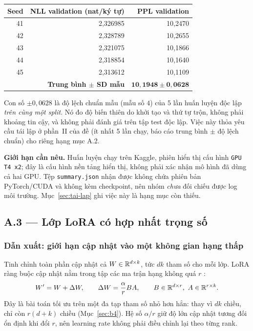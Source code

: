 \begin{center}
\begin{tabular}{rrr}
\toprule
\textbf{Seed} & \textbf{NLL validation (nat/ký tự)} & \textbf{PPL validation}\\
\midrule
41 & 2,326985 & 10,2470\\
42 & 2,328789 & 10,2655\\
43 & 2,321075 & 10,1866\\
44 & 2,318854 & 10,1640\\
45 & 2,313612 & 10,1109\\
\midrule
\multicolumn{2}{r}{\textbf{Trung bình $\pm$ SD mẫu}} & $\mathbf{10{,}1948 \pm 0{,}0628}$\\
\bottomrule
\end{tabular}
\end{center}

Con số $\pm 0{,}0628$ là độ lệch chuẩn mẫu (mẫu số $4$) của 5 lần huấn luyện độc
lập \emph{trên cùng một split}. Nó đo độ biến thiên do khởi tạo và thứ tự trộn,
không phải khoảng tin cậy, và không phải đánh giá trên tập test độc lập. Việc này
thỏa yêu cầu tái lập ở phần~II của đề (ít nhất 5 lần chạy, báo cáo trung bình $\pm$
độ lệch chuẩn) cho riêng hạng mục A.2.

\textbf{Giới hạn cần nêu.} Huấn luyện chạy trên Kaggle, phiên hiển thị cấu hình
\texttt{GPU T4 x2}; đây là cấu hình nền tảng hiển thị, không phải xác nhận mô hình
đã dùng cả hai GPU. Tệp \texttt{summary.json} nhận được không chứa phiên bản
PyTorch/CUDA và không kèm checkpoint, nên nhóm \emph{chưa} đối chiếu được log môi
trường. Mục~\ref{sec:tai-lap} ghi việc này là hạng mục còn thiếu.

\subsection{A.3 --- Lớp LoRA có hợp nhất trọng số}
\label{sec:a3}

\subsubsection{Dẫn xuất: giới hạn cập nhật vào một không gian hạng thấp}

Tinh chỉnh toàn phần cập nhật cả $W\in\mathbb{R}^{d\times k}$, tức $dk$ tham số cho mỗi
lớp. LoRA ràng buộc cập nhật nằm trong tập các ma trận hạng không quá $r$
\cite[§4.1]{lora}:
\[
  W'=W+\Delta W,\qquad \Delta W=\frac{\alpha}{r}BA,\qquad
  B\in\mathbb{R}^{d\times r},\ A\in\mathbb{R}^{r\times k}.
\]
Đây là bài toán tối ưu trên một đa tạp tham số nhỏ hơn hẳn: thay vì $dk$ chiều,
chỉ còn $r(d+k)$ chiều (Mục~\ref{sec:b4}). Hệ số $\alpha/r$ giữ độ lớn cập nhật
tương đối ổn định khi đổi $r$, nên learning rate không phải điều chỉnh lại theo
từng rank.

